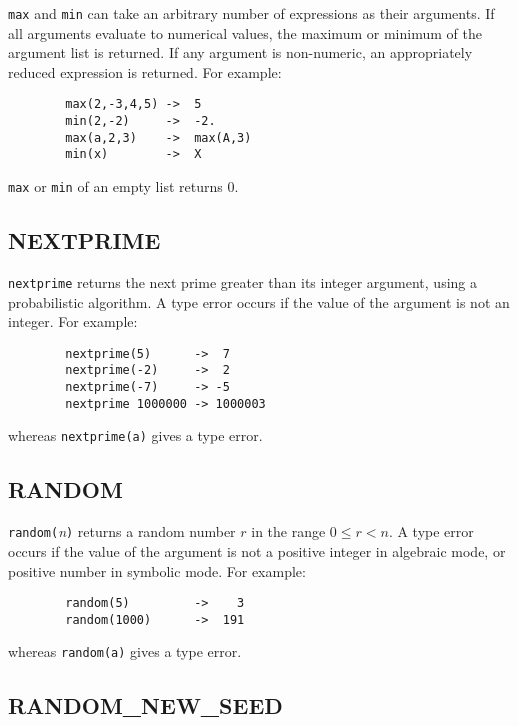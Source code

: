 \texttt{max} and \texttt{min} can take an arbitrary
number of expressions as their arguments.  If all arguments evaluate to
numerical values, the maximum or minimum of the argument list is returned.
If any argument is non-numeric, an appropriately reduced expression is
returned.  For example:
\begin{verbatim}
        max(2,-3,4,5) ->  5
        min(2,-2)     ->  -2.
        max(a,2,3)    ->  max(A,3)
        min(x)        ->  X
\end{verbatim}
\texttt{max} or \texttt{min} of an empty list returns 0.

\subsection{NEXTPRIME}
\hypertarget{operator:NEXTPRIME}{}

\texttt{nextprime} returns the next prime greater than its integer argument,
using a probabilistic algorithm.  A type error occurs if the value of the
argument is not an integer.  For example:
\begin{verbatim}
        nextprime(5)      ->  7
        nextprime(-2)     ->  2
        nextprime(-7)     -> -5
        nextprime 1000000 -> 1000003
\end{verbatim}
whereas \texttt{nextprime(a)} gives a type error.

\subsection{RANDOM}
\hypertarget{operator:RANDOM}{}

\texttt{random(}{\em n\/}\texttt{)} returns a random number $r$ in the
range $0\leq r < n$.  A type error occurs if the value of the argument is not a
positive integer in algebraic mode, or positive number in symbolic mode.
For example:
\begin{verbatim}
        random(5)         ->    3
        random(1000)      ->  191
\end{verbatim}
whereas \texttt{random(a)} gives a type error.

\subsection{RANDOM\_NEW\_SEED}
\hypertarget{operator:RANDOM_NEW_SEED}{}

